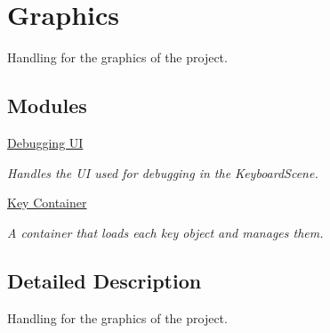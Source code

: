 \hypertarget{group___doc_graphics}{}\section{Graphics}
\label{group___doc_graphics}


Handling for the graphics of the project.  


\subsection*{Modules}
\begin{DoxyCompactItemize}
\item 
\hyperlink{group___doc_deb_u_i}{Debugging UI}
\begin{DoxyCompactList}\small\item\em Handles the UI used for debugging in the Keyboard\+Scene. \end{DoxyCompactList}\item 
\hyperlink{group___doc_key_contain}{Key Container}
\begin{DoxyCompactList}\small\item\em A container that loads each key object and manages them. \end{DoxyCompactList}\end{DoxyCompactItemize}


\subsection{Detailed Description}
Handling for the graphics of the project. 

